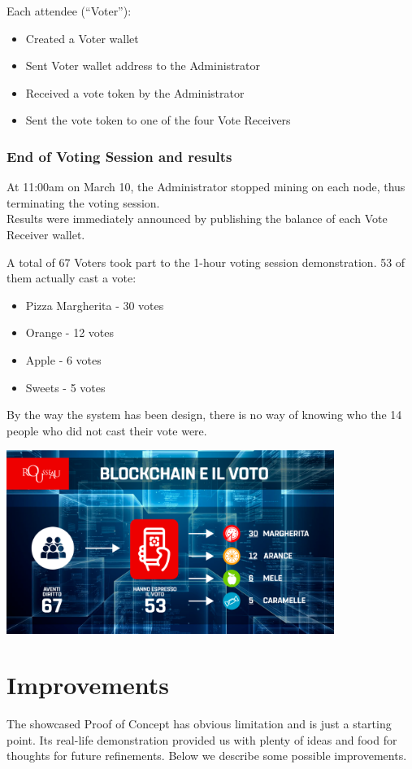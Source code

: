 \documentclass[10pt, letterpaper]{article}
\begin{document}
Each attendee (“Voter”):
\begin{itemize}
\item Created a Voter wallet
\item Sent Voter wallet address to the Administrator
\item Received a vote token by the Administrator
\item Sent the vote token to one of the four Vote Receivers
\end{itemize}

\subsubsection{End of Voting Session and results}
At 11:00am on March 10, the Administrator stopped mining on each node, thus terminating the voting session.\\
Results were immediately announced by publishing the balance of each Vote Receiver wallet.
\bigskip

A total of 67 Voters took part to the 1-hour voting session demonstration. 53 of them actually cast a vote:
\begin{itemize}
\item Pizza Margherita - 30 votes
\item Orange - 12 votes 
\item Apple - 6 votes
\item Sweets - 5 votes
\end{itemize}
By the way the system has been design, there is no way of knowing who the 14 people who did not cast their vote were.
\bigskip

\includegraphics[width=0.8\textwidth]{blockchain_voto.png}

\section{Improvements}
The showcased Proof of Concept has obvious limitation and is just a starting point. Its real-life demonstration provided us with plenty of ideas and food for thoughts for future refinements. Below we describe some possible improvements.
\end{document}
